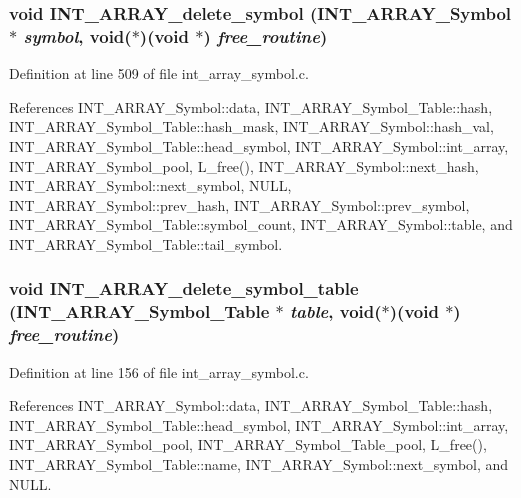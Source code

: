 \subsubsection{\setlength{\rightskip}{0pt plus 5cm}void INT\_\-ARRAY\_\-delete\_\-symbol (\bf{INT\_\-ARRAY\_\-Symbol} $\ast$ {\em symbol}, void($\ast$)(void $\ast$) {\em free\_\-routine})}\label{int__array__symbol_8c_533999339cace50156198164086bcfae}




Definition at line 509 of file int\_\-array\_\-symbol.c.

References INT\_\-ARRAY\_\-Symbol::data, INT\_\-ARRAY\_\-Symbol\_\-Table::hash, INT\_\-ARRAY\_\-Symbol\_\-Table::hash\_\-mask, INT\_\-ARRAY\_\-Symbol::hash\_\-val, INT\_\-ARRAY\_\-Symbol\_\-Table::head\_\-symbol, INT\_\-ARRAY\_\-Symbol::int\_\-array, INT\_\-ARRAY\_\-Symbol\_\-pool, L\_\-free(), INT\_\-ARRAY\_\-Symbol::next\_\-hash, INT\_\-ARRAY\_\-Symbol::next\_\-symbol, NULL, INT\_\-ARRAY\_\-Symbol::prev\_\-hash, INT\_\-ARRAY\_\-Symbol::prev\_\-symbol, INT\_\-ARRAY\_\-Symbol\_\-Table::symbol\_\-count, INT\_\-ARRAY\_\-Symbol::table, and INT\_\-ARRAY\_\-Symbol\_\-Table::tail\_\-symbol.
\subsubsection{\setlength{\rightskip}{0pt plus 5cm}void INT\_\-ARRAY\_\-delete\_\-symbol\_\-table (\bf{INT\_\-ARRAY\_\-Symbol\_\-Table} $\ast$ {\em table}, void($\ast$)(void $\ast$) {\em free\_\-routine})}\label{int__array__symbol_8c_336e609695f0bbfbe0630d7e0e14a971}




Definition at line 156 of file int\_\-array\_\-symbol.c.

References INT\_\-ARRAY\_\-Symbol::data, INT\_\-ARRAY\_\-Symbol\_\-Table::hash, INT\_\-ARRAY\_\-Symbol\_\-Table::head\_\-symbol, INT\_\-ARRAY\_\-Symbol::int\_\-array, INT\_\-ARRAY\_\-Symbol\_\-pool, INT\_\-ARRAY\_\-Symbol\_\-Table\_\-pool, L\_\-free(), INT\_\-ARRAY\_\-Symbol\_\-Table::name, INT\_\-ARRAY\_\-Symbol::next\_\-symbol, and NULL.
